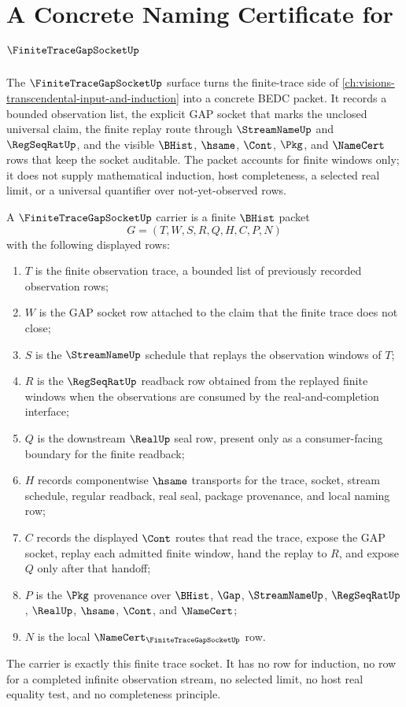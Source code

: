 \chapter{A Concrete Naming Certificate for $\FiniteTraceGapSocketUp$}
\label{ch:concrete-instances-finite-trace-gap-socket-namecert}

The $\FiniteTraceGapSocketUp$ surface turns the finite-trace side of \autoref{ch:visions-transcendental-input-and-induction} into a concrete BEDC packet. It records a bounded observation list, the explicit GAP socket that marks the unclosed universal claim, the finite replay route through $\StreamNameUp$ and $\RegSeqRatUp$, and the visible $\BHist$, $\hsame$, $\Cont$, $\Pkg$, and $\NameCert$ rows that keep the socket auditable. The packet accounts for finite windows only; it does not supply mathematical induction, host completeness, a selected real limit, or a universal quantifier over not-yet-observed rows.

\begin{definition}
\label{def:finite-trace-gap-socket-carrier}
A $\FiniteTraceGapSocketUp$ carrier is a finite $\BHist$ packet
$$
G=(T,W,S,R,Q,H,C,P,N)
$$
with the following displayed rows:
\begin{enumerate}
\item $T$ is the finite observation trace, a bounded list of previously recorded observation rows;
\item $W$ is the GAP socket row attached to the claim that the finite trace does not close;
\item $S$ is the $\StreamNameUp$ schedule that replays the observation windows of $T$;
\item $R$ is the $\RegSeqRatUp$ readback row obtained from the replayed finite windows when the observations are consumed by the real-and-completion interface;
\item $Q$ is the downstream $\RealUp$ seal row, present only as a consumer-facing boundary for the finite readback;
\item $H$ records componentwise $\hsame$ transports for the trace, socket, stream schedule, regular readback, real seal, package provenance, and local naming row;
\item $C$ records the displayed $\Cont$ routes that read the trace, expose the GAP socket, replay each admitted finite window, hand the replay to $R$, and expose $Q$ only after that handoff;
\item $P$ is the $\Pkg$ provenance over $\BHist$, $\Gap$, $\StreamNameUp$, $\RegSeqRatUp$, $\RealUp$, $\hsame$, $\Cont$, and $\NameCert$;
\item $N$ is the local $\NameCert_{\FiniteTraceGapSocketUp}$ row.
\end{enumerate}
The carrier is exactly this finite trace socket. It has no row for induction, no row for a completed infinite observation stream, no selected limit, no host real equality test, and no completeness principle.
\end{definition}


